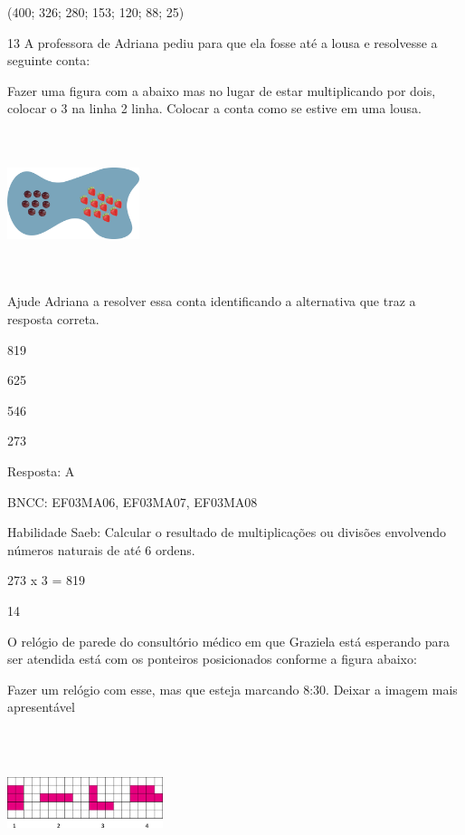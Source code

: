 \begin{escolha}
\begin{escolha}
(400; 326; 280; 153; 120; 88; 25)

\num{13} A professora de Adriana pediu para que ela fosse até a lousa e
resolvesse a seguinte conta:

Fazer uma figura com a abaixo mas no lugar de estar multiplicando por
dois, colocar o 3 na linha 2 linha. Colocar a conta como se estive em
uma lousa.

\includegraphics[width=1.51680in,height=1.67515in]{media/image114.png}

Ajude Adriana a resolver essa conta identificando a alternativa que traz
a resposta correta.

\begin{escolha}
\item
  819
\item
  625
\item
  546
\item
  273
\end{escolha}

Resposta: A

BNCC: EF03MA06, EF03MA07, EF03MA08

Habilidade Saeb: Calcular o resultado de multiplicações ou divisões
envolvendo números naturais de até 6 ordens.

273 x 3 = 819

\num{14}

O relógio de parede do consultório médico em que Graziela está esperando
para ser atendida está com os ponteiros posicionados conforme a figura
abaixo:

Fazer um relógio com esse, mas que esteja marcando 8:30. Deixar a imagem
mais apresentável

\includegraphics[width=1.79182in,height=1.69181in]{media/image115.png}


\end{escolha}
\end{escolha}
